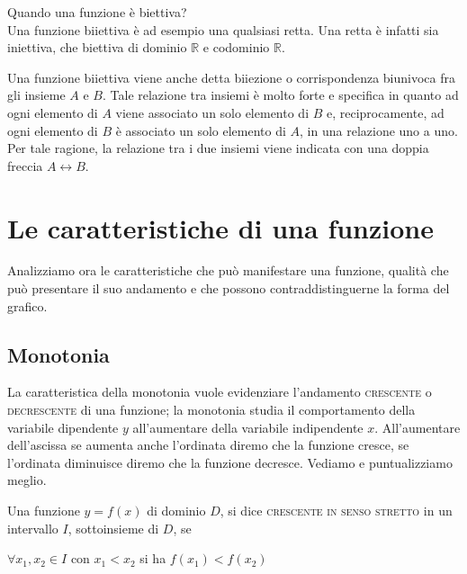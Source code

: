 \begin{esempio} Quando una funzione è biettiva?\\
Una funzione biiettiva è ad esempio una qualsiasi retta. Una retta è infatti 
sia iniettiva, che biettiva di dominio \(\mathbb{R}\) e codominio 
\(\mathbb{R}\).\\
\end{esempio}

Una funzione biiettiva viene anche detta biiezione o corrispondenza biunivoca 
fra gli insieme \(A\) e \(B\). Tale relazione tra insiemi è molto forte e 
specifica in quanto ad ogni elemento di \(A\) viene associato un solo elemento 
di \(B\) e, reciprocamente, ad ogni elemento di \(B\) è associato un solo 
elemento di \(A\), in una relazione uno a uno. Per tale ragione, la relazione 
tra i due insiemi viene indicata con una doppia freccia \(A\leftrightarrow B\).
%
\section{Le caratteristiche di una funzione}
Analizziamo ora le caratteristiche che può manifestare una funzione, qualità 
che può presentare il suo andamento e che possono contraddistinguerne la 
forma del grafico.

\subsection{Monotonia}
La caratteristica della monotonia vuole evidenziare l'andamento 
\textsc{crescente} o \textsc{decrescente} di una funzione; la monotonia 
studia il comportamento della variabile dipendente \(y\) all'aumentare della 
variabile indipendente \(x\). All'aumentare dell'ascissa se aumenta anche 
l'ordinata diremo che la funzione cresce, se l'ordinata diminuisce diremo che 
la funzione decresce. Vediamo e puntualizziamo meglio.

\begin{definizione}
Una funzione \(y=f(x)\) di dominio \(D\), si dice \textsc{crescente in senso 
stretto} in un intervallo \(I\), sottoinsieme di \(D\), se

\(\forall x_1,x_2\in I\)  con \(x_1<x_2 \) si ha \(f(x_1)<f(x_2)\)\\
\end{definizione}

